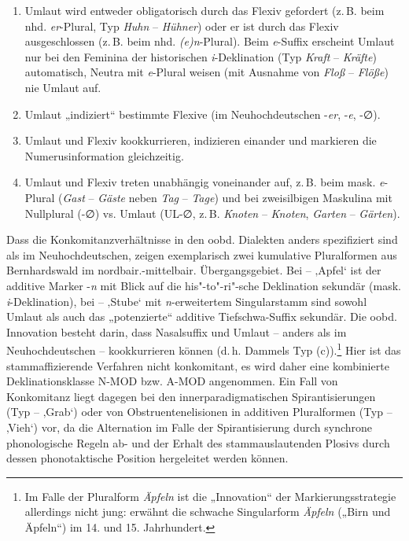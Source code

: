 \begin{enumerate}[label=(\alph*)]
\item Umlaut wird entweder obligatorisch durch das Flexiv gefordert (z.\,B. beim nhd. \textit{er}{}-Plural, Typ \textit{Huhn} -- \textit{Hühner}) oder er ist durch das Flexiv ausgeschlossen (z.\,B. beim nhd. \textit{(e)n}{}-Plural). Beim \textit{e}{}-Suffix erscheint Umlaut nur bei den Feminina der historischen \textit{i}{}-Deklination (Typ \textit{Kraft} -- \textit{Kräfte}) automatisch, Neutra mit \textit{e}{}-Plural weisen (mit Ausnahme von \textit{Floß} -- \textit{Flöße}) nie Umlaut auf.
\item Umlaut „indiziert“ bestimmte Flexive (im Neuhochdeutschen -\textit{er}, -\textit{e}, -∅).
\item Umlaut und Flexiv kookkurrieren, indizieren einander und markieren die Numerusinformation gleichzeitig.
\item Umlaut und Flexiv treten unabhängig voneinander auf, z.\,B. beim mask. \textit{e}{}-Plural (\textit{Gast} -- \textit{Gäste} neben \textit{Tag} -- \textit{Tage}) und bei zweisilbigen Maskulina mit Nullplural (-∅) vs. Umlaut (UL-∅, z.\,B. \textit{Knoten} -- \textit{Knoten}, \textit{Garten} -- \textit{Gärten}).
\end{enumerate}

\begin{sloppypar}
Dass die Konkomitanzverhältnisse in den oobd. Dialekten anders spezifiziert sind als im Neuhochdeutschen, zeigen exemplarisch zwei kumulative Pluralformen aus Bernhardswald im nordbair.-mittelbair. Übergangsgebiet. Bei  --  ‚Apfel‘ ist der additive Marker -\textit{n} mit Blick auf die his"-to"-ri"-sche Deklination sekundär (mask. \textit{i}{}-Deklination), bei  --  ‚Stube‘ mit \textit{n}{}-erweitertem Singularstamm sind sowohl Umlaut als auch das „potenzierte“ additive Tiefschwa-Suffix sekundär. Die oobd. Innovation besteht darin, dass Nasalsuffix und Umlaut -- anders als im Neuhochdeutschen -- kookkurrieren können (d.\,h. Dammels Typ (c)).\footnote{Im Falle der Pluralform \textit{Äpfeln} ist die „Innovation“ der Markierungsstrategie allerdings nicht jung: \citet[§36, Anmerkung 2]{Paul1968} erwähnt die schwache Singularform \textit{Äpfeln} („Birn und Äpfeln“) im 14. und 15. Jahrhundert.} Hier ist das stammaffizierende Verfahren nicht konkomitant, es wird daher eine kombinierte Deklinationsklasse N-MOD bzw. A-MOD angenommen. Ein Fall von Konkomitanz liegt dagegen bei den innerparadigmatischen Spirantisierungen (Typ  --  ‚Grab‘) oder von Obstruentenelisionen in additiven Pluralformen (Typ  --  ‚Vieh‘) vor, da die Alternation im Falle der Spirantisierung durch synchrone phonologische Regeln ab- und der Erhalt des stammauslautenden Plosivs durch dessen phonotaktische Position hergeleitet werden können.
\end{sloppypar}

